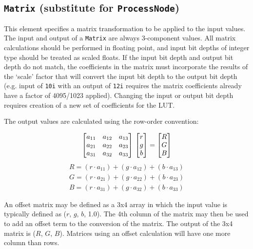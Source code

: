 \subsection{\texttt{Matrix} (substitute for \texttt{ProcessNode})}
This element specifies a matrix transformation to be applied to the input values. The input and output of a \texttt{Matrix} are always 3-component values. All matrix calculations should be performed in floating point, and input bit depths of integer type should be treated as scaled floats. If the input bit depth and output bit depth do not match, the coefficients in the matrix must incorporate the results of the `scale' factor that will convert the input bit depth to the output bit depth (e.g. input of \texttt{10i} with an output of \texttt{12i} requires the matrix coefficients already have a factor of 4095/1023 applied). Changing the input or output bit depth requires creation of a new set of coefficients for the LUT.

The output values are calculated using the row-order convention:

\begin{equation}
    \begin{bmatrix*}
        a_{11} & a_{12} & a_{13} \\
        a_{21} & a_{22} & a_{23} \\
        a_{31} & a_{32} & a_{33} \\
    \end{bmatrix*} \\
    \begin{bmatrix}
        r\\
        g\\
        b
    \end{bmatrix}
    =
    \begin{bmatrix}
        R\\
        G\\
        B
    \end{bmatrix}
\end{equation}
\begin{align*}		
	R = (r \cdot a_{11}) + (g \cdot a_{12}) + (b \cdot a_{13}) \\
	G = (r \cdot a_{21}) + (g \cdot a_{22}) + (b \cdot a_{23}) \\
	B = (r \cdot a_{31}) + (g \cdot a_{32}) + (b \cdot a_{33})
\end{align*}

An offset matrix may be defined as a 3x4 array in which the input value is typically defined as ($r$, $g$, $b$, 1.0).  The 4th column of the matrix may then be used to add an offset term to the conversion of the matrix. The output of the 3x4 matrix is ($R$, $G$, $B$). Matrices using an offset calculation will have one more column than rows.


